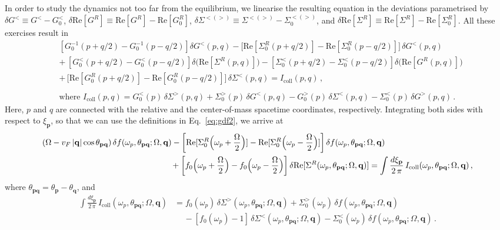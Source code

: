 \documentclass[aps, prb, onecolumn, nofootinbib, citeautoscript, 10pt]{revtex4-2}
\def \nn{\nonumber \\}
\newcommand{\bp}{\mathbf{p}}
\newcommand{\bq}{\mathbf{q}}
\begin{document}
In order to study the dynamics not too far from the equilibrium, we linearise the resulting equation in the deviations parametrised by $\delta G^< \equiv G^<-G^<_0$, $\delta \text{Re}[G^R] \equiv \text{Re}[G^R] - \text{Re}[G^R_0]$, $\delta \Sigma^{<(>)}\equiv \Sigma^{<(>)}-\Sigma^{<(>)}_0$, and $\delta \text{Re}[\Sigma^R ] \equiv \text{Re}[\Sigma^R] 
- \text{Re}[\Sigma^R_0]$. All these exercises result in
\begin{align}
	\label{QBEf}  
	&  \left[G_0^{-1}( p  +   q/2)-G_0^{-1}( p- q/2)\right] \delta G^<(p,q)
	-\Big [ \text{Re} [ \Sigma_0^R( p  +  q/2) ]  -\text{Re}  [\Sigma_0^R(p-q/2)]
	\Big ] \, \delta G^<(p,q)  
	\nn  &
	+  \, \left[G_0^<( p  +  q/2)-G_0^<( p- q/2)\right]
	\delta \Big (\text{Re} [ \Sigma^R(p,q)]\Big )
	-\left[\Sigma_0^<( p + q/2) - \Sigma_0^<( p-q/2)\right]\delta \Big (\text{Re} [ G^R(p,q)] \Big ) 
	\nn & 
	+    \, \Big [\text{Re} [ G_0^R( p + q/2)]-\text{Re} [ G_0^R( p-q/2)]
	\Big] \, \delta \Sigma^<(p,q) 
	= I_{\text{coll}} (p,q)\,,\nn &
	\nn & \text{where }
	I_{\text{coll}} (p, q) = 
	G_0^<(p)\, \delta \Sigma^>(p,q)  +  \Sigma_0^>(p)  \,\delta G^<(p,q)
	-G_0^>(p)  \,  \delta \Sigma^<(p,q)-\Sigma_0^<(p)   \,   \delta G^>(p,q)  \,.
\end{align}
Here, $p$ and $q$ are connected with the relative and the center-of-mass spacetime coordinates, respectively. 
Integrating both sides with respect to $\xi_\bp$, so that we can use the definitions in Eq.~\eqref{eq:gdf2}, we arrive at
\begin{align}
	& (\Omega-v_F \,|\bq|\cos\theta_{\bp\bq}) \, \delta f ( \omega_p , \theta_{\bp \bq}; \Omega, \bq)
	-\left[\text{Re}[\Sigma_0^R \Big (\omega_p  +  \frac{\Omega}{2} \Big)]
	-\text{Re} [\Sigma_0^R \Big(\omega_p-\frac{\Omega}{2} \Big)] \right] 
	\delta f ( \omega_p , \theta_{\bp \bq}; \Omega, \bq)
	\nn &  \hspace{ 5.5 cm} +  \left[f_0 \Big (\omega_p  +  \frac{\Omega}{2} \Big )
	- f_0 \Big (\omega_p-\frac{\Omega}{2} \Big )\right] 
	\delta \text{Re} [ \Sigma^R ( \omega_p, \theta_{\bp \bq}; \Omega, \bq)]
	= \int \frac{d\xi_\bp}{ 2 \, \pi } 
	\,  I_{\text{coll}} ( \omega_p, \theta_{\bp \bq}; \Omega, \bq)\,,
	\label{eq_int_qbe}
\end{align}
where $\theta_{\bp \bq}=\theta_\bp-\theta_\bq$, and
\begin{align}
	\int \frac{d\xi_\bp}{ 2 \, \pi } \,
	I_{\text{coll}} ( \omega_p, \theta_{\bp \bq}; \Omega, \bq) 
	&   = f_0(\omega_p) \,\delta\Sigma^> ( \omega_p, \theta_{\bp \bq}; \Omega, \bq)  
	+  \Sigma_0^>(\omega_p) \, \delta f ( \omega_p, \theta_{\bp \bq}; \Omega, \bq) 
	\nn & \,\quad
	-  [ f_0(\omega_p)-1 ] \, \delta \Sigma^< ( \omega_p, \theta_{\bp \bq}; \Omega, \bq) 
	-\Sigma_0^<(\omega_p) \, \delta f ( \omega_p, \theta_{\bp \bq}; \Omega, \bq) \,.
	\label{eq-int-coll}
\end{align} 
\end{document}
